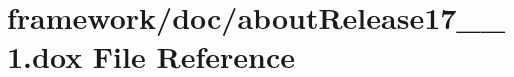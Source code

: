 \hypertarget{about_release17__08__1_8dox}{}\section{framework/doc/about\+Release17\+\_\+\_\+1.dox File Reference}
\label{about_release17__08__1_8dox}
